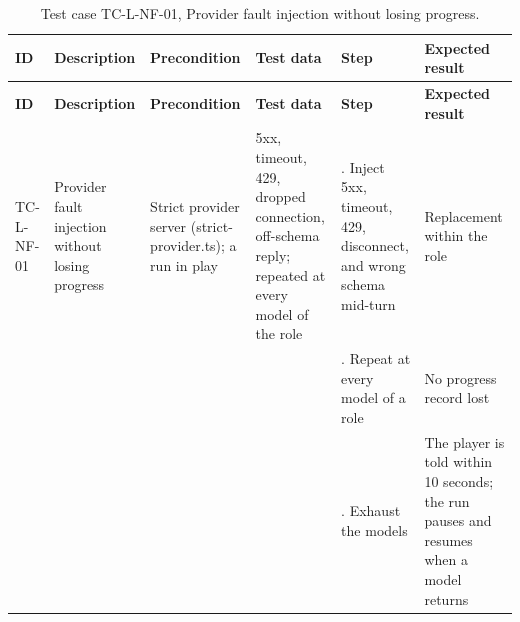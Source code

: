 {\footnotesize{}\renewcommand{\arraystretch}{1.1}
\begin{longtable}{|>{\raggedright\arraybackslash}p{}|>{\raggedright\arraybackslash}p{}|>{\raggedright\arraybackslash}p{}|>{\raggedright\arraybackslash}p{}|>{\raggedright\arraybackslash}p{}|>{\raggedright\arraybackslash}p{}|}
\caption{Test case TC-L-NF-01, Provider fault injection without losing progress.} \\
\hline
\textbf{ID} & \textbf{Description} & \textbf{Precondition} & \textbf{Test data} & \textbf{Step} & \textbf{Expected result} \\ \hline
\endfirsthead
\hline
\textbf{ID} & \textbf{Description} & \textbf{Precondition} & \textbf{Test data} & \textbf{Step} & \textbf{Expected result} \\ \hline
\endhead
TC-L-NF-01 & Provider fault injection without losing progress & Strict provider server (strict-\allowbreak{}provider.\allowbreak{}ts); a run in play & 5xx, timeout, 429, dropped connection, off-schema reply; repeated at every model of the role & 1. Inject 5xx, timeout, 429, disconnect, and wrong schema mid-turn & Replacement within the role \\ \cline{5-6}
 &  &  &  & 2. Repeat at every model of a role & No progress record lost \\ \cline{5-6}
 &  &  &  & 3. Exhaust the models & The player is told within 10 seconds; the run pauses and resumes when a model returns \\ \hline
\end{longtable}
}

